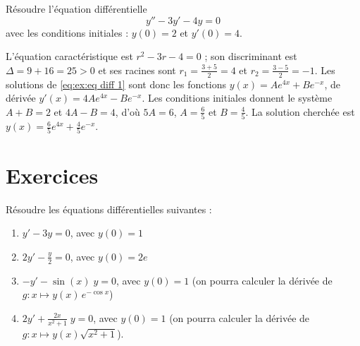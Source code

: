             \begin{ex}
                  R\'esoudre l'\'equation diff\'erentielle
                        \begin{equation}
                        \label{eq:ex:eq diff 1}
                              y'' - 3 y' - 4 y = 0
                        \end{equation}
                  avec les conditions initiales : $y(0) = 2 $ et $y'(0) = 4$.

                  L'\'equation caract\'eristique est $r^2 - 3r - 4 = 0$ ; son discriminant est $\Delta = 9 + 16 = 25 > 0$
                  et ses racines sont $r_1 = \frac{3 + 5}{2} = 4$ et $r_2 = \frac{3 - 5}{2} = -1$.
                  Les solutions de \eqref{eq:ex:eq diff 1} sont donc les fonctions $y(x) = A e^{4x} + B e^{-x}$,
                  de d\'eriv\'ee $y'(x) = 4A e^{4x} - B e^{-x}$.
                  Les conditions initiales donnent le syst\`eme $A + B = 2$ et $4A - B = 4$,
                  d'o\`u $5A = 6$, $A = \frac{6}{5}$ et $B = \frac{4}{5}$.
                  La solution cherch\'ee est $y(x) = \frac{6}{5} e^{4x} + \frac{4}{5} e^{-x}$.
            \end{ex}

\TCDLessonStyleOff
\clearpage
\section{Exercices}
\begin{exo}
\label{exo:ed premier ordre}
R\'esoudre les \'equations diff\'erentielles suivantes :
\begin{enumerate}
\item $y' - 3 y = 0$, avec $y(0) = 1$
\item $2 y' - \frac{y}{2} = 0$, avec $y(0) = 2 e$
\item $ - y' - \sin(x) \; y = 0$, avec $y(0) = 1$
      (on pourra calculer la d\'eriv\'ee de $g : x \mapsto y(x)\, e^{-\cos x}$)
\item $2 y' + \frac{2x}{x^2 + 1} \; y = 0$, avec $y(0) = 1$
      (on pourra calculer la d\'eriv\'ee de $g : x \mapsto y(x) \sqrt{x^2 + 1}$).
\end{enumerate}
\end{exo}

